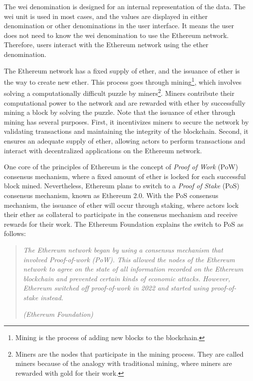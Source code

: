 The wei denomination is designed for an internal representation of the data. The wei unit is used in most cases, and the values
are displayed in either denomination or other denominations in the user interface. It means the user does not need to
know the wei denomination to use the Ethereum network. Therefore, users interact with the Ethereum network using the ether denomination.


The Ethereum network has a fixed supply of ether, and the issuance of ether
is the way to create new ether. This process goes through mining\footnote{Mining is the process of adding new blocks to the blockchain.},
which involves solving a computationally difficult puzzle by miners\footnote{Miners are the nodes that participate in the mining process. They are
called miners because of the analogy with traditional mining, where miners are rewarded with gold for their work.}.
Miners contribute their computational power to the network and are rewarded with ether by successfully mining a block by solving the puzzle.
Note that the issuance of ether through mining has several purposes. First, it incentivizes miners to secure the network by validating transactions
and maintaining the integrity of the blockchain. Second, it ensures an adequate supply of ether, allowing actors to perform transactions and interact
with decentralized applications on the Ethereum network.




One core of the principles of Ethereum is the concept of \textit{Proof of Work} (PoW) consensus mechanism, where a fixed amount of ether is locked
for each successful block mined. Nevertheless, Ethereum plans to switch to a \textit{Proof of Stake} (PoS) consensus mechanism, known as
Ethereum 2.0. With the PoS consensus mechanism, the issuance of ether will occur through staking, where actors lock their ether as collateral to
participate in the consensus mechanism and receive rewards for their work. The Ethereum Foundation \cite{eth_proofofstake} explains the switch
to PoS as follows:


\begin{quote}
   \textit{The Ethereum network began by using a consensus mechanism that involved Proof-of-work (PoW). This allowed the nodes of the Ethereum network to agree on the state of all information recorded on the Ethereum blockchain
   and prevented certain kinds of economic attacks. However, Ethereum switched off proof-of-work in 2022 and started using proof-of-stake instead.}


   \textit{(Ethereum Foundation)}
\end{quote}


